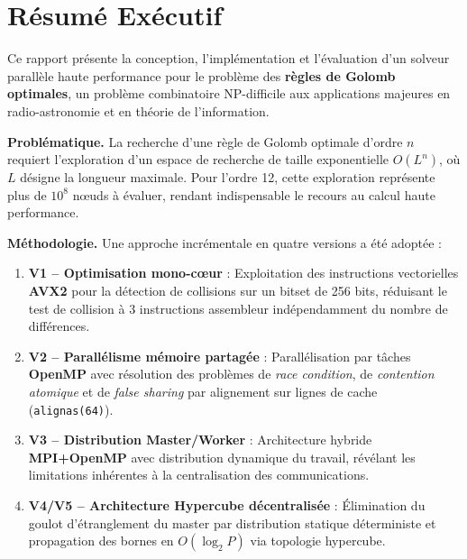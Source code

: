 \documentclass[12pt,a4paper,twoside]{report}
\begin{document}
\tableofcontents
\newpage


\chapter*{Résumé Exécutif}

\begin{tcolorbox}[colback=blue!3, colframe=blue!40!black, title=\textbf{Synthèse du Projet}]
Ce rapport présente la conception, l'implémentation et l'évaluation d'un solveur parallèle haute performance pour le problème des \textbf{règles de Golomb optimales}, un problème combinatoire NP-difficile aux applications majeures en radio-astronomie et en théorie de l'information.
\end{tcolorbox}

\vspace{0.5cm}

\textbf{Problématique.} La recherche d'une règle de Golomb optimale d'ordre $n$ requiert l'exploration d'un espace de recherche de taille exponentielle $O(L^n)$, où $L$ désigne la longueur maximale. Pour l'ordre 12, cette exploration représente plus de $10^8$ nœuds à évaluer, rendant indispensable le recours au calcul haute performance.

\vspace{0.3cm}

\textbf{Méthodologie.} Une approche incrémentale en quatre versions a été adoptée :

\begin{enumerate}[leftmargin=*, itemsep=2pt]
    \item \textbf{V1 -- Optimisation mono-cœur} : Exploitation des instructions vectorielles \textbf{AVX2} pour la détection de collisions sur un bitset de 256 bits, réduisant le test de collision à 3 instructions assembleur indépendamment du nombre de différences.

    \item \textbf{V2 -- Parallélisme mémoire partagée} : Parallélisation par tâches \textbf{OpenMP} avec résolution des problèmes de \textit{race condition}, de \textit{contention atomique} et de \textit{false sharing} par alignement sur lignes de cache (\texttt{alignas(64)}).

    \item \textbf{V3 -- Distribution Master/Worker} : Architecture hybride \textbf{MPI+OpenMP} avec distribution dynamique du travail, révélant les limitations inhérentes à la centralisation des communications.

    \item \textbf{V4/V5 -- Architecture Hypercube décentralisée} : Élimination du goulot d'étranglement du master par distribution statique déterministe et propagation des bornes en $O(\log_2 P)$ via topologie hypercube.
\end{enumerate}
\end{document}
